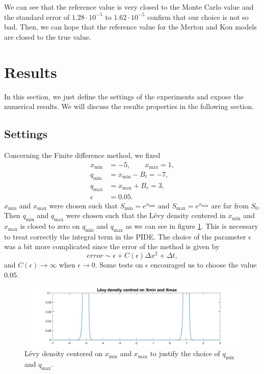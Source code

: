 We can see that the reference value is very closed to the Monte Carlo value and the standard error of $1.28\cdot 10^{-5}$ to $1.62\cdot 10^{-5}$ confirm that our choice is not so bad. Then, we can hope that the reference value for the Merton and Kou models are closed to the true value.

\section{Results}
\label{sec:res:results}
In this section, we just define the settings of the experiments and expose the numerical results. We will discuss the results properties in the following section.
\subsection{Settings}
Concerning the Finite difference method, we fixed 
\begin{align*}
x_{\min} &= -5, \qquad x_{\max} = 1,\\
q_{\min} &= x_{\min}-B_l = -7, \\
q_{\max} &= x_{\max}+B_r = 3, \\
\epsilon &= 0.05.
\end{align*}
$x_{\min}$ and $x_{\max}$ were chosen such that $S_{\min} = e^{x_{\min}}$ and $S_{\max}=e^{x_{\max}}$ are far from $S_0$. Then $q_{\min}$ and $q_{\max}$ were chosen such that the L\'evy density centered in $x_{\min}$ and $x_{\max}$ is closed to zero on $q_{\min}$ and $q_{\max}$ as we can see in figure \ref{fig:qmin-qmax}. This is necessary to treat correctly the integral term in the PIDE. The choice of the parameter $\epsilon$ was a bit more complicated since the error of the method is given by
$$error \sim \epsilon + C(\epsilon) \Delta x^2 + \Delta t,$$
and $C(\epsilon) \to \infty$ when $\epsilon \to 0$. Some tests on $\epsilon$ encouraged us to choose the value 0.05.

\begin{figure}[!htb]
\centering
	\includegraphics[width=\textwidth]{gfx/qmin_qmax}
	\caption{L\'evy density centered on $x_{\min}$ and $x_{\max}$ to justify the choice of $q_{\min}$ and $q_{\max}$.}
	\label{fig:qmin-qmax}
\end{figure}

